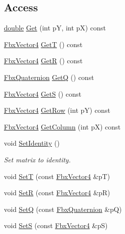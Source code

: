 \subsection*{Access}
\begin{DoxyCompactItemize}
\item 
\hyperlink{class_fbx_a_matrix_ad463edbb9fea344643297701f159faa7}{double} \hyperlink{class_fbx_a_matrix_ac3271d21b23683864a324ad93c860aad}{Get} (int pY, int pX) const
\item 
\hyperlink{class_fbx_vector4}{Fbx\+Vector4} \hyperlink{class_fbx_a_matrix_adbf66581dbcec6acb82b3721a0394c88}{GetT} () const
\item 
\hyperlink{class_fbx_vector4}{Fbx\+Vector4} \hyperlink{class_fbx_a_matrix_a8c5a30b339c691ecc66b1151f5e8df8b}{GetR} () const
\item 
\hyperlink{class_fbx_quaternion}{Fbx\+Quaternion} \hyperlink{class_fbx_a_matrix_ad65916a52b30b14175213b24111e845b}{GetQ} () const
\item 
\hyperlink{class_fbx_vector4}{Fbx\+Vector4} \hyperlink{class_fbx_a_matrix_a2d5efe3883f4a41c8ff8c223b5835fa1}{GetS} () const
\item 
\hyperlink{class_fbx_vector4}{Fbx\+Vector4} \hyperlink{class_fbx_a_matrix_ac9390e435954f95cee145123452ace46}{Get\+Row} (int pY) const
\item 
\hyperlink{class_fbx_vector4}{Fbx\+Vector4} \hyperlink{class_fbx_a_matrix_a73d4fbefc0fa5888553d3e7e0784e971}{Get\+Column} (int pX) const
\item 
void \hyperlink{class_fbx_a_matrix_a941b5c3ae5985e1f75a61f792a743098}{Set\+Identity} ()
\begin{DoxyCompactList}\small\item\em Set matrix to identity. \end{DoxyCompactList}\item 
void \hyperlink{class_fbx_a_matrix_af0a9e6bcdd7a41353676ded28ab77f2a}{SetT} (const \hyperlink{class_fbx_vector4}{Fbx\+Vector4} \&pT)
\item 
void \hyperlink{class_fbx_a_matrix_ad749080abe63a56225df153dab876c1f}{SetR} (const \hyperlink{class_fbx_vector4}{Fbx\+Vector4} \&pR)
\item 
void \hyperlink{class_fbx_a_matrix_a583269a598ba62a1b6897619c2469b54}{SetQ} (const \hyperlink{class_fbx_quaternion}{Fbx\+Quaternion} \&pQ)
\item 
void \hyperlink{class_fbx_a_matrix_a6da268a626104c3a1696e298200621d1}{SetS} (const \hyperlink{class_fbx_vector4}{Fbx\+Vector4} \&pS)
\item 

\end{DoxyCompactItemize}

